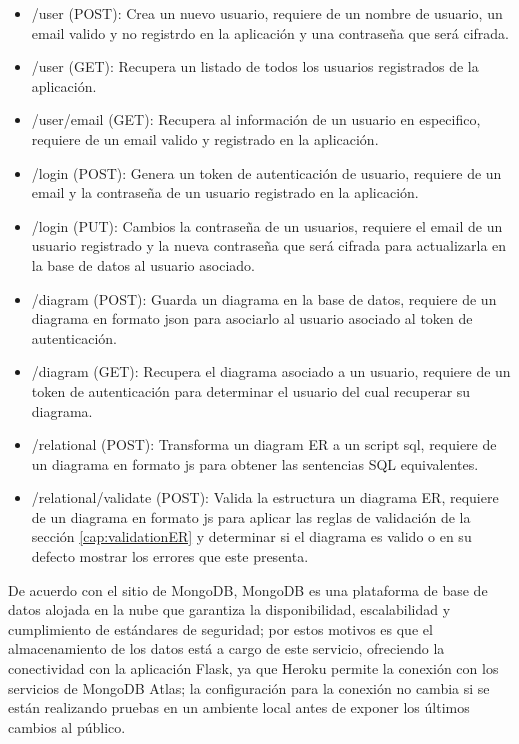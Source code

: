 \begin{itemize}
    \item /user (POST): Crea un nuevo usuario, requiere de un nombre de usuario, un email valido y no registrdo en la aplicación y una contraseña que será cifrada.
    \item /user (GET): Recupera un listado de todos los usuarios registrados de la aplicación.
    \item /user/{email} (GET): Recupera al información de un usuario en especifico, requiere de un email valido y registrado en la aplicación.
    \item /login (POST): Genera un token de autenticación de usuario, requiere de un email y la contraseña de un usuario registrado en la aplicación.
    \item /login (PUT): Cambios la contraseña de un usuarios, requiere el email de un usuario registrado y la nueva contraseña que será cifrada para actualizarla en la base de datos al usuario asociado.
    \item /diagram (POST): Guarda un diagrama en la base de datos, requiere de un diagrama en formato json para asociarlo al usuario asociado al token de autenticación.
    \item /diagram (GET): Recupera el diagrama asociado a un usuario, requiere de un token de autenticación para determinar el usuario del cual recuperar su diagrama.
    \item /relational (POST): Transforma un diagram ER a un script sql, requiere de un diagrama en formato js para obtener las sentencias SQL equivalentes.
    \item /relational/validate (POST): Valida la estructura un diagrama ER, requiere de un diagrama en formato js para aplicar las reglas de validación de la sección \ref{cap:validationER} y determinar si el diagrama es valido o en su defecto mostrar los errores que este presenta.
\end{itemize}


De acuerdo con el sitio de MongoDB\cite{mongodb_mongodb_2020}, MongoDB es una plataforma de base de datos alojada en la nube que garantiza la disponibilidad, escalabilidad y cumplimiento de estándares de seguridad; por estos motivos es que el almacenamiento de los datos está a cargo de este servicio, ofreciendo la conectividad con la aplicación Flask, ya que Heroku permite la conexión con los servicios de MongoDB Atlas; la configuración para la conexión no cambia si se están realizando pruebas en un ambiente local antes de exponer los últimos cambios al público.
